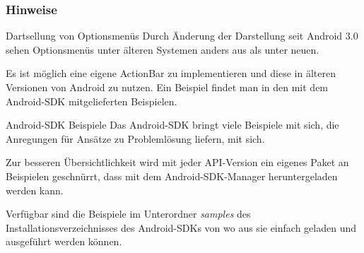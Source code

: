\begin{frame}
   \frametitle{Hinweise}

   \begin{alertblock}{Dartsellung von Optionsmenüs}
      Durch Änderung der Darstellung seit Android 3.0 sehen Optionsmenüs 
      unter älteren Systemen anders aus als unter neuen.

      \vspace{3mm}

      Es ist möglich eine eigene ActionBar zu implementieren und diese in älteren Versionen 
      von Android zu nutzen. Ein Beispiel findet man in den mit dem Android-SDK 
      mitgelieferten Beispielen.
   \end{alertblock}

   \begin{alertblock}{Android-SDK Beispiele}
      Das Android-SDK bringt viele Beispiele mit sich, die Anregungen für Ansätze 
      zu Problemlösung liefern, mit sich.

      \vspace{3mm}

      Zur besseren Übersichtlichkeit wird mit jeder API-Version ein eigenes Paket an 
      Beispielen geschnürrt, dass mit dem Android-SDK-Manager heruntergeladen werden kann. 

      \vspace{3mm}

      Verfügbar sind die Beispiele im Unterordner \emph{samples} 
      des Installationsverzeichnisses des Android-SDKs von wo aus sie einfach geladen und 
      ausgeführt werden können.
   \end{alertblock}
\end{frame}

